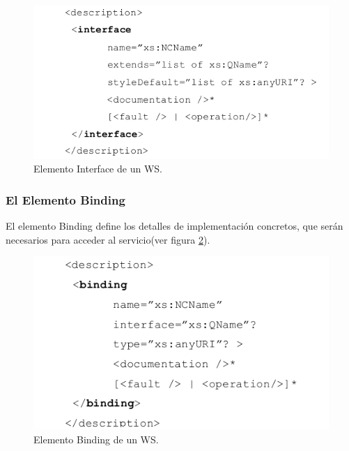 \begin{figure}[!h] 
	\begin{center}
		\includegraphics [scale=0.70]{imagenes/elemento_interface.png}
	\end{center}
	\caption{Elemento Interface de un WS.}
	\label{fig:Elemento Interface de un WS}
\end{figure} 

\subsubsection*{El Elemento Binding}

El elemento Binding define los detalles de implementación concretos, que serán necesarios para acceder al servicio(ver figura \ref{fig:Elemento Binding de un WS}).

\begin{figure}[!h] 
\begin{center}
	\includegraphics [scale=0.70]{imagenes/elemento_binding.png}
\end{center}
\caption{Elemento Binding de un WS.}
\label{fig:Elemento Binding de un WS}
\end{figure} 

